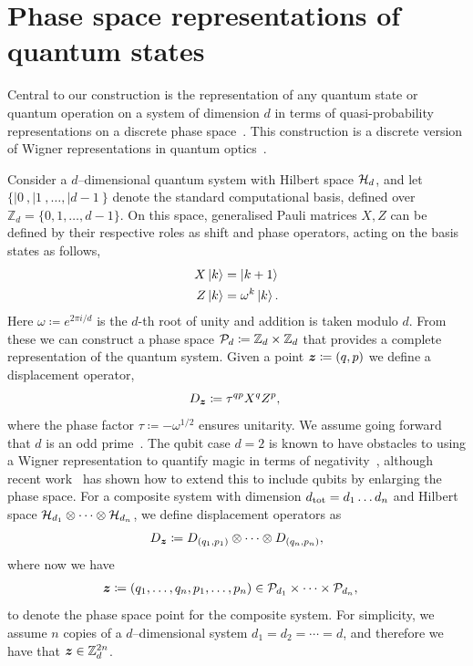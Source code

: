 \documentclass[pra,
aps,
twocolumn,
superscriptaddress,
groupedaddress,
nofootinbib,
reprint
]{revtex4-1}
\begin{document}
\section{Phase space representations of quantum states}
\label{sec:ps}

Central to our construction is the representation of any quantum state or quantum operation on a system of dimension $d$ in terms of quasi-probability representations on a discrete phase space~\cite{Ferrie_2008}. This construction is a discrete version of Wigner representations in quantum optics~\cite{Wigner_1932, Vourdas_2004}.

Consider a $d$--dimensional quantum system with Hilbert space $\H_d$, and let $\{ |0\>, |1\>, \dots , |d-1\>\}$ denote the standard computational basis, defined over $\mathbb{Z}_d = \{ 0, 1, \dots,d-1 \}$. On this space, generalised Pauli matrices $X, Z$ can be defined by their respective roles as shift and phase operators, acting on the basis states as follows,
\begin{align}
    X \ket{k} &= \ket{k + 1} \label{eq:xpauli}\\
	Z \ket{k} &= \omega^k \ket{k}. \label{eq:zpauli}
\end{align}
Here $\omega \coloneqq e^{2\pi i/d}$ is the $d$-th root of unity and addition is taken modulo $d$. From these we can construct a phase space $\cal{P}_d \coloneqq \mathbb{Z}_d \times \mathbb{Z}_d$ that provides a complete representation of the quantum system. Given a point $\bmz \coloneqq (q, p)$ we define a displacement operator, 
\begin{equation}\label{eq:ddef}
    D_{\bmz} \coloneqq \tau^{q p} X^{q} Z^{p},\ 
\end{equation}
where the phase factor $\tau \coloneqq -\omega^{1/2}$ ensures unitarity. We assume going forward that $d$ is an odd prime~\cite{Appleby_2005}. The qubit case $d=2$ is known to have obstacles to using a Wigner representation to quantify magic in terms of negativity~\cite{Mermin_1990, cit:howard2}, although recent work~\cite{Raussendorf_qubits} has shown how to extend this to include qubits by enlarging the phase space. For a composite system with dimension $d_{\rm tot} = d_1 \dots d_n$ and Hilbert space $\cal{H}_{d_1} \otimes \dots \otimes \cal{H}_{d_n}$, we define displacement operators as
\begin{equation}\label{eq:composited}
    D_{\bmz} \coloneqq D_{(q_1, p_1)} \otimes \dots \otimes D_{(q_n, p_n)},
\end{equation}
where now we have
\begin{align*}
	\bmz &\coloneqq (q_1, \dots, q_n, p_1, \dots, p_n) \in \cal{P}_{d_1} \times \dots \times \cal{P}_{d_n},
\end{align*}
to denote the phase space point for the composite system. 
For simplicity, we assume $n$ copies of a $d$--dimensional system $d_1=d_2 = \cdots = d$, and therefore we have that $\bmz \in \mathbb{Z}_d^{2n}$.
\end{document}

